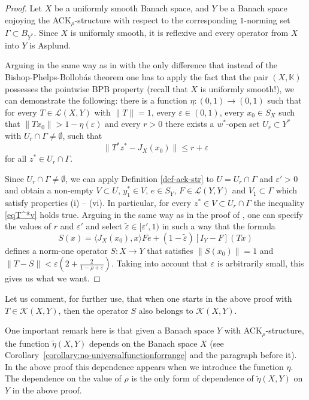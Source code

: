 \documentclass[a4paper,10pt]{amsart}
\theoremstyle{plain}
\theoremstyle{definition}
\newcommand{\K}{\mathbb{K}}
\newcommand{\norm}[1]{\ensuremath{\lVert#1\rVert}}
\newcommand{\eps}{\varepsilon}
\renewcommand{\leq}{\leqslant}
\begin{document}
\begin{proof} Let $X$ be a uniformly smooth Banach space, and $Y$ be a Banach space enjoying the ACK$_{\rho}$-structure with respect to the corresponding $1$-norming set $\Gamma \subset B_{Y^*}$. Since $X$ is uniformly smooth, it is reflexive and every operator from $X$ into $Y$ is Asplund.

Arguing in the same way as in \cite[Lemma 2.3]{cas-alt23} with the only difference that instead of the Bishop-Phelps-Bollob\'as theorem one has to apply the fact that the pair $(X, \K)$ possesses the pointwise BPB property (recall that $X$ is uniformly smooth!), we can demonstrate the following: there is a function $\eta: (0, 1) \longrightarrow (0, 1)$ such that for every $T \in \mathcal{L}(X,Y)$ with $\norm{T}=1$,  every $\eps \in (0, 1)$, every $x_0\in S_X$ such that $\norm{Tx_0} > 1-\eta(\eps)$ and every $r>0$ there exists
 a $w^*$-open set $U_r \subset Y^*$ with $U_r \cap \Gamma \neq\emptyset$,
   such that
\begin{equation} \label{eqT^*v}
\norm{T^*z^* - J_X(x_0)}\leq  r +  \eps
\end{equation}
for all $z^*\in U_r \cap \Gamma$.

Since $U_r \cap \Gamma \neq\emptyset$, we can apply Definition \ref{def-ack-str} to $U =  U_r  \cap \Gamma$ and $\eps' > 0$ and obtain a {non-empty} $V  \subset U$, $y_1^* \in V$, $e \in S_Y$, $F \in \mathcal{L}(Y,Y)$ and $V_1 \subset \Gamma$  which satisfy properties (i) -- (vi). In particular, for every $z^* \in V \subset U_r \cap \Gamma$ the inequality \eqref{eqT^*v} holds true. Arguing in the same way as in the proof of \cite[Lemma~3.5]{CGKS}, one can specify the values of $r$ and $\eps'$ and select $\widetilde{\eps} \in [\eps', 1)$  in such a way that the formula
\begin{equation*}\label{eq:operadorDef-new}
S(x) = \langle J_X(x_0), x \rangle Fe+(1-\widetilde{\eps})[I_Y-F](Tx)
\end{equation*}
defines a norm-one operator $S\colon X\longrightarrow Y$ that satisfies $\|S(x_0)\| = 1$ and $\|T - S\| < \eps\left( 2 + \frac{2}{1 - \rho + \eps}\right)$. Taking into account that $\eps$ is arbitrarily small, this gives us what we want.
\end{proof}


Let us comment, for further use, that when one starts in the above proof with $T\in \mathcal{K}(X,Y)$, then the operator $S$ also belongs to $\mathcal{K}(X,Y)$.

One important remark here is that given a Banach space $Y$ with ACK$_\rho$-structure, the function $\tilde\eta(X,Y)$ depends on the Banach space $X$ (see Corollary~\ref{corollary:no-universalfunctionforrange} and the paragraph before it). In the above proof this dependence appears when we introduce the function $\eta$. The dependence on the value of $\rho$ is the only form of dependence of $\tilde\eta(X,Y)$ on $Y$ in the above proof.
\end{document}
